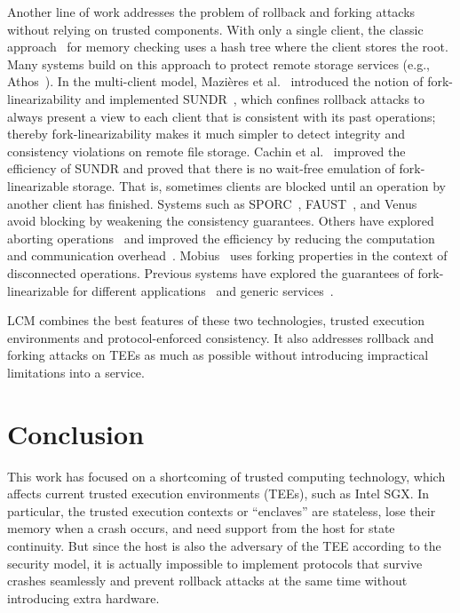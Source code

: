 \documentclass[11pt]{article}
\theoremstyle{plain-boldhead}
\theoremstyle{definition-boldhead}
\newcommand{\pp}{LCM\xspace}
\begin{document}
Another line of work addresses the problem of rollback and forking attacks
without relying on trusted components.  
% 
With only a single client, the classic approach~\cite{blum1994} for memory
checking uses a hash tree where the client stores the root.  Many systems
build on this approach to protect remote storage services (e.g.,
Athos~\cite{Goodrich:2008:AEA:1432478.1432486}). 
%
In the multi-client model, Mazi{\`e}res et al.~\cite{mazsha02} introduced the
notion of fork-linearizability and implemented SUNDR~\cite{lkms04}, which
confines rollback attacks to always present a view to each client that is
consistent with its past operations; thereby fork-linearizability makes it
much simpler to detect integrity and consistency violations on remote file
storage.
% 
Cachin et al.~\cite{cashsh07} improved the efficiency of SUNDR and proved that
there is no wait-free emulation of fork-linearizable storage. That is,
sometimes clients are blocked until an operation by another client has
finished.  Systems such as SPORC~\cite{fzff10}, FAUST~\cite{cakesh11}, and
Venus~\cite{scckms10} avoid blocking by weakening the consistency guarantees.
Others have explored aborting operations~\cite{mdss09,cacohr14} and improved
the efficiency by reducing the computation and communication
overhead~\cite{brcakn15}.
% 
Mobius~\cite{mobius12} uses forking properties in the context of
disconnected operations.
% 
Previous systems have explored the guarantees of fork-linearizable for different
applications~\cite{fzff10,wisish09} and generic services~\cite{cacohr14}.

\pp combines the best features of these two technologies, trusted execution
environments and protocol-enforced consistency.  It also addresses rollback
and forking attacks on TEEs as much as possible without
introducing impractical limitations into a service.


\section{Conclusion}\label{sec:conclusion}

This work has focused on a shortcoming of trusted computing technology,
which affects current trusted execution environments (TEEs), such as Intel
SGX.  In particular, the trusted execution contexts or ``enclaves'' are
stateless, lose their memory when a crash occurs, and need support from the
host for state continuity.  But since the host is also the adversary of the
TEE according to the security model, it is actually impossible to implement
protocols that survive crashes seamlessly and prevent rollback attacks at
the same time without introducing extra
hardware.
 
\end{document}
